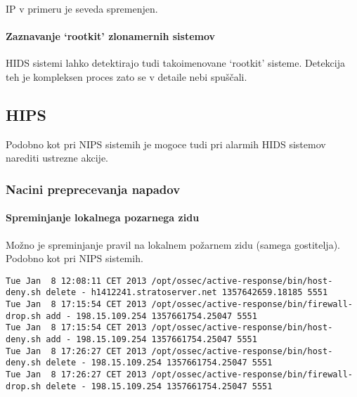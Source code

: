\documentclass[12pt]{article}
\begin{document}
IP v primeru je seveda spremenjen.


\paragraph{Zaznavanje `rootkit' zlonamernih sistemov} %

HIDS sistemi lahko detektirajo tudi takoimenovane `rootkit' sisteme.
Detekcija teh je kompleksen proces zato se v detaile nebi spuščali.




\subsection{HIPS}

Podobno kot pri NIPS sistemih je mogoce tudi pri alarmih HIDS sistemov narediti ustrezne akcije.

\subsubsection{Nacini preprecevanja napadov} %


\paragraph{Spreminjanje lokalnega pozarnega zidu} %

Možno je spreminjanje pravil na lokalnem požarnem zidu (samega gostitelja).
Podobno kot pri NIPS sistemih.

\begin{verbatim}
Tue Jan  8 12:08:11 CET 2013 /opt/ossec/active-response/bin/host-deny.sh delete - h1412241.stratoserver.net 1357642659.18185 5551
Tue Jan  8 17:15:54 CET 2013 /opt/ossec/active-response/bin/firewall-drop.sh add - 198.15.109.254 1357661754.25047 5551
Tue Jan  8 17:15:54 CET 2013 /opt/ossec/active-response/bin/host-deny.sh add - 198.15.109.254 1357661754.25047 5551
Tue Jan  8 17:26:27 CET 2013 /opt/ossec/active-response/bin/host-deny.sh delete - 198.15.109.254 1357661754.25047 5551
Tue Jan  8 17:26:27 CET 2013 /opt/ossec/active-response/bin/firewall-drop.sh delete - 198.15.109.254 1357661754.25047 5551

\end{verbatim}
\end{document}
